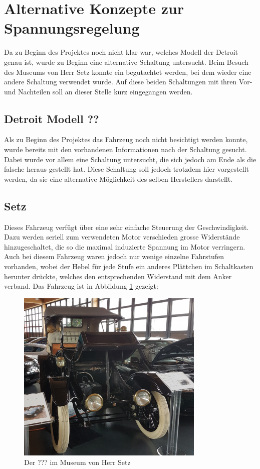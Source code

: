 \section{Alternative Konzepte zur Spannungsregelung}
Da zu Beginn des Projektes noch nicht klar war, welches Modell der Detroit genau ist, wurde zu Beginn eine alternative Schaltung untersucht. Beim Besuch des Museums von Herr Setz konnte ein  begutachtet werden, bei dem wieder eine andere Schaltung verwendet wurde. Auf diese beiden Schaltungen mit ihren Vor- und Nachteilen soll an dieser Stelle kurz eingegangen werden.

\subsection{Detroit Modell ??}
Als zu Beginn des Projektes das Fahrzeug noch nicht besichtigt werden konnte, wurde bereits mit den vorhandenen Informationen nach der Schaltung gesucht. Dabei wurde vor allem eine Schaltung untersucht, die sich jedoch am Ende als die falsche heraus gestellt hat. Diese Schaltung soll jedoch trotzdem hier vorgestellt werden, da sie eine alternative Möglichkeit des selben Herstellers darstellt.

\subsection{Setz}
Dieses Fahrzeug verfügt über eine sehr einfache Steuerung der Geschwindigkeit. Dazu werden seriell zum verwendeten Motor verschieden grosse Widerstände hinzugeschaltet, die so die maximal induzierte Spannung im Motor verringern. Auch bei diesem Fahrzeug waren jedoch nur wenige einzelne Fahrstufen vorhanden, wobei der Hebel für jede Stufe ein anderes Plättchen im Schaltkasten herunter drückte, welches den entsprechenden Widerstand mit dem Anker verband. Das Fahrzeug ist in Abbildung \ref{fig:Setz} gezeigt:

\begin{figure}[h]
	\centering
		\includegraphics[width=0.8\textwidth]{images/Setz.JPG}
	\caption{Der ??? im Museum von Herr Setz}
	\label{fig:Setz}
\end{figure}

